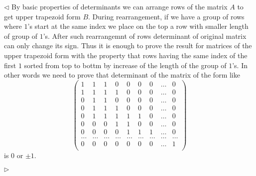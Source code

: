 \documentclass[12pt]{article}
\newenvironment{solution}{\par $\triangleleft$}{$\triangleright$}
\begin{document}
\begin{solution} By basic properties of determinants we can arrange rows of the matrix $A$ to get upper trapezoid form $B$. During rearrangement, if we have a group of rows where $1$'s start at the same index we place on the top a row with smaller length of group of $1$'s. After such rearrangemnt of rows determinant of original matrix can only change its sign. Thus it is enough to prove the result for matrices of the upper trapezoid form with the property that rows having the same index of the first $1$ sorted from top to bottm by increase of the length of the group of $1$'s. In other words we need to prove that determinant of the matrix of the form like
$$
\begin{pmatrix}
1      & 1      & 1      & 0      & 0      & 0      & 0      & \ldots & 0      \\
1      & 1      & 1      & 1      & 0      & 0      & 0      & \ldots & 0      \\
0      & 1      & 1      & 0      & 0      & 0      & 0      & \ldots & 0      \\
0      & 1      & 1      & 1      & 0      & 0      & 0      & \ldots & 0      \\
0      & 1      & 1      & 1      & 1      & 1      & 0      & \ldots & 0      \\
0      & 0      & 0      & 1      & 1      & 0      & 0      & \ldots & 0      \\
0      & 0      & 0      & 0      & 1      & 1      & 1      & \ldots & 0      \\
\ldots & \ldots & \ldots & \ldots & \ldots & \ldots & \ldots & \ldots & \ldots \\
0      & 0      & 0      & 0      & 0      & 0      & 0      & \ldots & 1      \\
\end{pmatrix}
$$
is $0$ or $\pm 1$. 
 

\end{solution}
\end{document}
